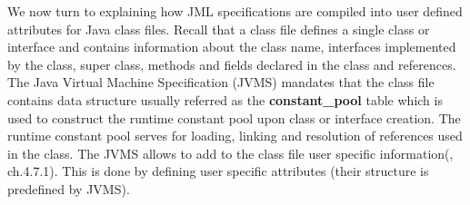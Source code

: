 
We now turn to explaining how JML specifications are compiled into user defined attributes for Java class files. Recall that a class file defines
a single class or interface and contains information about  the class name, interfaces implemented by the class, super class, methods and fields declared in the class and references. The Java Virtual Machine Specification (JVMS) \cite{VMSpec} mandates that the class file contains data structure usually referred as the \textbf{constant\_pool} table which is used to construct the runtime constant pool upon class or interface creation. The runtime constant pool serves for loading, linking and resolution of references used in the class. The JVMS allows to add to the class file user specific information(\cite{VMSpec}, ch.4.7.1). This is done by defining user specific attributes  (their structure is predefined by JVMS).

